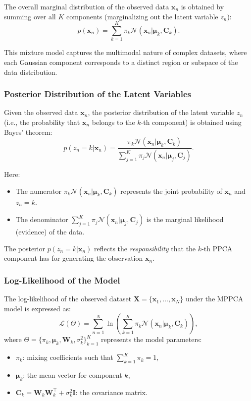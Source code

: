 \documentclass{article}
\begin{document}
The overall marginal distribution of the observed data \(\mathbf{x}_n\) is obtained by summing over all \(K\) components (marginalizing out the latent variable \(z_n\)):
\[
p(\mathbf{x}_n) = \sum_{k=1}^K \pi_k \mathcal{N}(\mathbf{x}_n | \boldsymbol{\mu}_k, \mathbf{C}_k).
\]

This mixture model captures the multimodal nature of complex datasets, where each Gaussian component corresponds to a distinct region or subspace of the data distribution.

\subsubsection{Posterior Distribution of the Latent Variables}

Given the observed data \(\mathbf{x}_n\), the posterior distribution of the latent variable \(z_n\) (i.e., the probability that \(\mathbf{x}_n\) belongs to the \(k\)-th component) is obtained using Bayes' theorem:
\[
p(z_n = k | \mathbf{x}_n) = \frac{\pi_k \mathcal{N}(\mathbf{x}_n | \boldsymbol{\mu}_k, \mathbf{C}_k)}{\sum_{j=1}^K \pi_j \mathcal{N}(\mathbf{x}_n | \boldsymbol{\mu}_j, \mathbf{C}_j)}.
\]

Here:
\begin{itemize}
    \item The numerator \(\pi_k \mathcal{N}(\mathbf{x}_n | \boldsymbol{\mu}_k, \mathbf{C}_k)\) represents the joint probability of \(\mathbf{x}_n\) and \(z_n = k\).
    \item The denominator \(\sum_{j=1}^K \pi_j \mathcal{N}(\mathbf{x}_n | \boldsymbol{\mu}_j, \mathbf{C}_j)\) is the marginal likelihood (evidence) of the data.
\end{itemize}

The posterior \(p(z_n = k | \mathbf{x}_n)\) reflects the \textit{responsibility} that the \(k\)-th PPCA component has for generating the observation \(\mathbf{x}_n\).

\subsubsection{Log-Likelihood of the Model}

The log-likelihood of the observed dataset \(\mathbf{X} = \{\mathbf{x}_1, \dots, \mathbf{x}_N\}\) under the MPPCA model is expressed as:
\[
\mathcal{L}(\Theta) = \sum_{n=1}^N \ln \left( \sum_{k=1}^K \pi_k \mathcal{N}(\mathbf{x}_n | \boldsymbol{\mu}_k, \mathbf{C}_k) \right),
\]
where \(\Theta = \{\pi_k, \boldsymbol{\mu}_k, \mathbf{W}_k, \sigma_k^2\}_{k=1}^K\) represents the model parameters:
\begin{itemize}
    \item \(\pi_k\): mixing coefficients such that \(\sum_{k=1}^K \pi_k = 1\),
    \item \(\boldsymbol{\mu}_k\): the mean vector for component \(k\),
    \item \(\mathbf{C}_k = \mathbf{W}_k \mathbf{W}_k^\top + \sigma_k^2 \mathbf{I}\): the covariance matrix.
\end{itemize}
\end{document}
